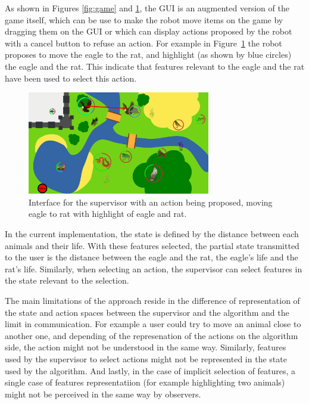 \documentclass[letterpaper]{article} %
\begin{document}
As shown in Figures \ref{fig:game} and \ref{fig:gui}, the GUI is an augmented
version of the game itself, which can be use to make the robot move items on the
game by dragging them on the GUI or which can display actions proposed by the
robot with a cancel button to refuse an action. For example in
Figure~\ref{fig:gui} the robot proposes to move the eagle to the rat, and
highlight (as shown by blue circles) the eagle and the rat. This indicate that
features relevant to the eagle and the rat have been used to select this action.
\begin{figure}
        \centering
    \includegraphics[width=80mm]{./fig/proposition.png}
    \caption{Interface for the supervisor with an action being proposed, moving
        eagle to rat with highlight of eagle and rat.}
        \label{fig:gui}
\end{figure}


In the current implementation, the state is defined by the distance between each
animals and their life. With these features selected, the partial state
transmitted to the user is the distance between the eagle and the rat, the eagle's life and
the rat's life. Similarly, when selecting an action, the supervisor can 
select features in the state relevant to the selection.

The main limitations of the approach reside in the difference of
representation of the state and action spaces between the supervisor and the
algorithm and the limit in communication. For example a user could try to move
an animal close to another one,
and depending of the represenation of the actions on the algorithm side, the
action might not be understood in the same way. Similarly, features used by the
supervisor to select actions might not be represented in the state used by the
algorithm. And lastly, in the case of implicit selection of features, a single
case of features representatiion (for example highlighting two animals) might not
be perceived in the same way by observers.
\end{document}

